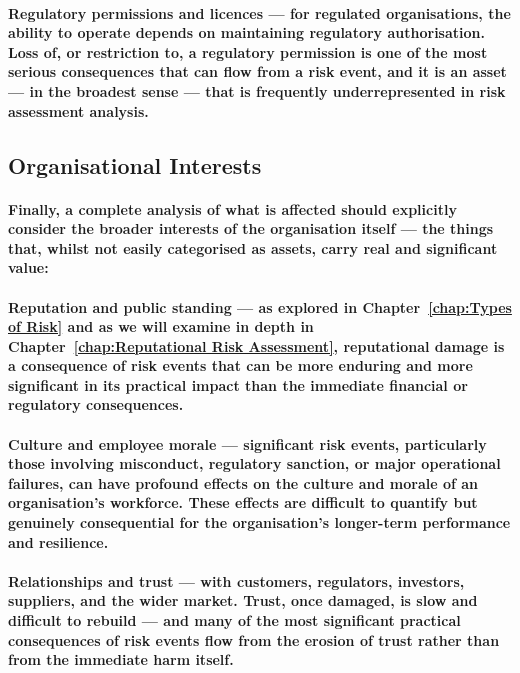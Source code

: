 \paragraph{\textbf{Regulatory permissions and licences} — for regulated organisations, the ability to operate depends on maintaining regulatory authorisation. Loss of, or restriction to, a regulatory permission is one of the most serious consequences that can flow from a risk event, and it is an asset — in the broadest sense — that is frequently underrepresented in risk assessment analysis.}

\subsection{Organisational Interests}
\paragraph{Finally, a complete analysis of what is affected should explicitly consider the broader interests of the organisation itself — the things that, whilst not easily categorised as assets, carry real and significant value:}
\paragraph{\textbf{Reputation and public standing} — as explored in Chapter~\ref{chap:Types of Risk} and as we will examine in depth in Chapter~\ref{chap:Reputational Risk Assessment}, reputational damage is a consequence of risk events that can be more enduring and more significant in its practical impact than the immediate financial or regulatory consequences.}
\paragraph{\textbf{Culture and employee morale} — significant risk events, particularly those involving misconduct, regulatory sanction, or major operational failures, can have profound effects on the culture and morale of an organisation's workforce. These effects are difficult to quantify but genuinely consequential for the organisation's longer-term performance and resilience.}
\paragraph{\textbf{Relationships and trust} — with customers, regulators, investors, suppliers, and the wider market. Trust, once damaged, is slow and difficult to rebuild — and many of the most significant practical consequences of risk events flow from the erosion of trust rather than from the immediate harm itself.}

